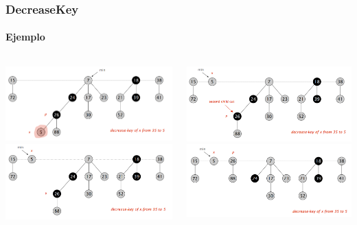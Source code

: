 \documentclass{beamer}
\begin{document}
\begin{frame}
  \frametitle{DecreaseKey}
  \framesubtitle{Ejemplo}
   
     \begin{columns}[t]
    \centering
    \includegraphics[width =1 \textwidth]{img/decrease/05.png} \\
    \includegraphics[width =1 \textwidth]{img/decrease/06.png}
      
    \centering
    \includegraphics[width =1 \textwidth]{img/decrease/07.png} \\
    \includegraphics[width =1 \textwidth]{img/decrease/08.png}

   \end{columns}
   
\end{frame}
\end{document}
